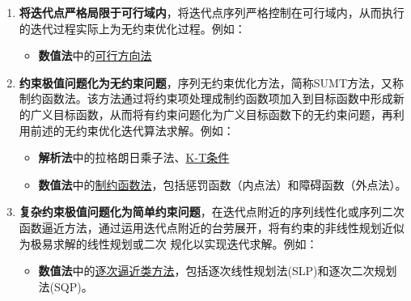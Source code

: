 \begin{enumerate}
    \item \textbf{将迭代点严格局限于可行域内}，将迭代点序列严格控制在可行域内，从而执行的迭代过程实际上为无约束优化过程。例如：
    \begin{itemize}
    \item \textbf{数值法}中的\hyperref[sec:可行方向法]{可行方向法}
    \end{itemize}
    \item \textbf{约束极值问题化为无约束问题}，序列无约束优化方法，简称SUMT方法，又称制约函数法。该方法通过将约束项处理成制约函数项加入到目标函数中形成新的广义目标函数，从而将有约束问题化为广义目标函数下的无约束问题，再利用前述的无约束优化迭代算法求解。例如：
    \begin{itemize}
        \item \textbf{解析法}中的拉格朗日乘子法、\hyperref[sec:K-T条件]{K-T条件}
        \item \textbf{数值法}中的\hyperref[sec:制约函数法]{制约函数法}，包括惩罚函数（内点法）和障碍函数（外点法）。
    \end{itemize}
    \item \textbf{复杂约束极值问题化为简单约束问题}，在迭代点附近的序列线性化或序列二次函数逼近方法，通过运用迭代点附近的台劳展开，将有约束的非线性规划近似为极易求解的线性规划或二次
    规化以实现迭代求解。例如：
    \begin{itemize}
        \item \textbf{数值法}中的\hyperref[sec:逐次逼近类方法]{逐次逼近类方法}，包括逐次线性规划法(SLP)和逐次二次规划法(SQP)。
    \end{itemize}

\end{enumerate}

